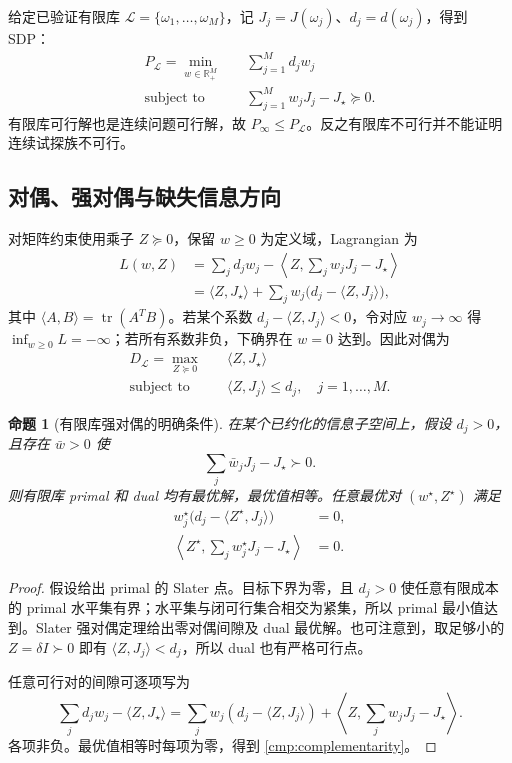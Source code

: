 \documentclass[11pt,a4paper]{article}
\numberwithin{equation}{section}
\newtheorem{proposition}[theorem]{命题}
\theoremstyle{definition}
\DeclareMathOperator{\tr}{tr}
\newcommand{\R}{\mathbb R}
\begin{document}
给定已验证有限库 $\mathcal L=\{\omega_1,\ldots,\omega_M\}$，记 $J_j=J(\omega_j)$、$d_j=d(\omega_j)$，得到 SDP：
\begin{align}
 P_{\mathcal L}=\min_{w\in\R_+^M}\quad &\sum_{j=1}^M d_jw_j\\
 \text{subject to}\quad &\sum_{j=1}^M w_jJ_j-J_\star\succeq0.
 \label{cmp:finite-primal}
\end{align}
有限库可行解也是连续问题可行解，故 $P_\infty\le P_{\mathcal L}$。反之有限库不可行并不能证明连续试探族不可行。

\subsection{对偶、强对偶与缺失信息方向}
\label{cmp:dual}

对矩阵约束使用乘子 $Z\succeq0$，保留 $w\ge0$ 为定义域，Lagrangian 为
\begin{align}
 L(w,Z)
 &=\sum_jd_jw_j-\left\langle Z,\sum_jw_jJ_j-J_\star\right\rangle\\
 &=\langle Z,J_\star\rangle
   +\sum_jw_j\bigl(d_j-\langle Z,J_j\rangle\bigr),
\end{align}
其中 $\langle A,B\rangle=\tr(A^TB)$。若某个系数 $d_j-\langle Z,J_j\rangle<0$，令对应 $w_j\to\infty$ 得 $\inf_{w\ge0}L=-\infty$；若所有系数非负，下确界在 $w=0$ 达到。因此对偶为
\begin{align}
 D_{\mathcal L}=\max_{Z\succeq0}\quad &\langle Z,J_\star\rangle\\
 \text{subject to}\quad &\langle Z,J_j\rangle\le d_j,\quad j=1,\ldots,M.
 \label{cmp:finite-dual}
\end{align}

\begin{proposition}[有限库强对偶的明确条件]
\label{cmp:strong-duality}
在某个已约化的信息子空间上，假设 $d_j>0$，且存在 $\bar w>0$ 使
\begin{equation}
 \sum_j\bar w_jJ_j-J_\star\succ0.
\end{equation}
则有限库 primal 和 dual 均有最优解，最优值相等。任意最优对 $(w^\star,Z^\star)$ 满足
\begin{align}
 w_j^\star\bigl(d_j-\langle Z^\star,J_j\rangle\bigr)&=0,\\
 \left\langle Z^\star,\sum_jw_j^\star J_j-J_\star\right\rangle&=0.
 \label{cmp:complementarity}
\end{align}
\end{proposition}
\begin{proof}
假设给出 primal 的 Slater 点。目标下界为零，且 $d_j>0$ 使任意有限成本的 primal 水平集有界；水平集与闭可行集合相交为紧集，所以 primal 最小值达到。Slater 强对偶定理给出零对偶间隙及 dual 最优解\cite{boyd2004}。也可注意到，取足够小的 $Z=\delta I\succ0$ 即有 $\langle Z,J_j\rangle<d_j$，所以 dual 也有严格可行点。

任意可行对的间隙可逐项写为
\begin{equation}
 \sum_jd_jw_j-\langle Z,J_\star\rangle
 =\sum_jw_j(d_j-\langle Z,J_j\rangle)
  +\left\langle Z,\sum_jw_jJ_j-J_\star\right\rangle.
\end{equation}
各项非负。最优值相等时每项为零，得到 \eqref{cmp:complementarity}。
\end{proof}
\end{document}
